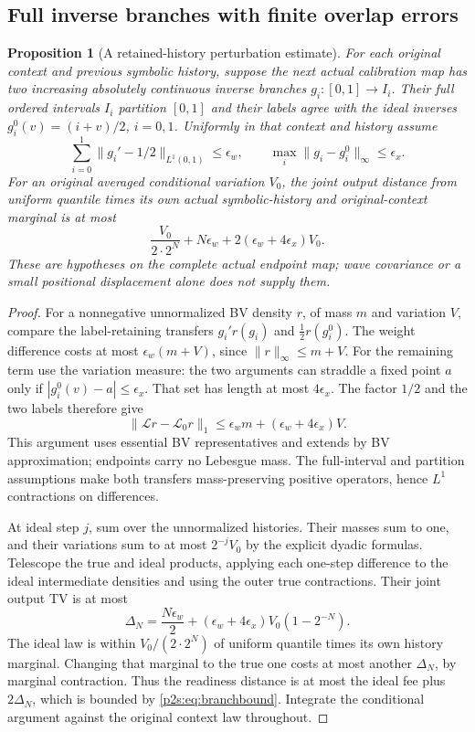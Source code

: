\documentclass[11pt]{article}
\numberwithin{equation}{section}
\newtheorem{proposition}[theorem]{Proposition}
\theoremstyle{definition}
\theoremstyle{remark}
\begin{document}
\subsection{Full inverse branches with finite overlap errors}
\begin{proposition}[A retained-history perturbation estimate]
\label{p2s:prop:inversebranches}
For each original context and previous symbolic history, suppose the next
actual calibration map has two increasing absolutely continuous inverse
branches $g_i:[0,1]\to I_i$. Their full ordered intervals $I_i$ partition
$[0,1]$ and their labels agree with the ideal inverses
$g_i^0(v)=(i+v)/2$, $i=0,1$. Uniformly in that context and history assume
\[
 \sum_{i=0}^1\|g_i'-1/2\|_{L^1(0,1)}\leq\epsilon_w,
 \qquad \max_i\|g_i-g_i^0\|_\infty\leq\epsilon_x.
\]
For an original averaged conditional variation $V_0$, the joint output
distance from uniform quantile times its own actual symbolic-history and
original-context marginal is at most
\begin{equation}\label{p2s:eq:branchbound}
 \frac{V_0}{2\cdot2^N}+N\epsilon_w
                  +2(\epsilon_w+4\epsilon_x)V_0.
\end{equation}
These are hypotheses on the complete actual endpoint map; wave covariance
or a small positional displacement alone does not supply them.
\end{proposition}
\begin{proof}
For a nonnegative unnormalized BV density $r$, of mass $m$ and variation
$V$, compare the label-retaining transfers
$g_i' r(g_i)$ and $\tfrac12r(g_i^0)$. The weight difference costs at most
$\epsilon_w(m+V)$, since $\|r\|_\infty\leq m+V$. For the remaining term
use the variation measure: the two arguments can straddle a fixed point
$a$ only if $|g_i^0(v)-a|\leq\epsilon_x$. That set has length at most
$4\epsilon_x$. The factor $1/2$ and the two labels therefore give
\[
 \|\mathcal Lr-\mathcal L_0r\|_1
 \leq\epsilon_wm+(\epsilon_w+4\epsilon_x)V.
\]
This argument uses essential BV representatives and extends by BV
approximation; endpoints carry no Lebesgue mass. The full-interval and
partition assumptions make both transfers mass-preserving positive
operators, hence $L^1$ contractions on differences.

At ideal step $j$, sum over the unnormalized histories. Their masses sum
to one, and their variations sum to at most $2^{-j}V_0$ by the explicit
dyadic formulas. Telescope the true and ideal products, applying each
one-step difference to the ideal intermediate densities and using the
outer true contractions. Their joint output TV is at most
\[
 \Delta_N=\frac{N\epsilon_w}{2}
       +(\epsilon_w+4\epsilon_x)V_0(1-2^{-N}).
\]
The ideal law is within $V_0/(2\cdot2^N)$ of uniform quantile times its
own history marginal. Changing that marginal to the true one costs at
most another $\Delta_N$, by marginal contraction. Thus the readiness
distance is at most the ideal fee plus $2\Delta_N$, which is bounded by
\eqref{p2s:eq:branchbound}. Integrate the conditional argument against
the original context law throughout.
\end{proof}
\end{document}
